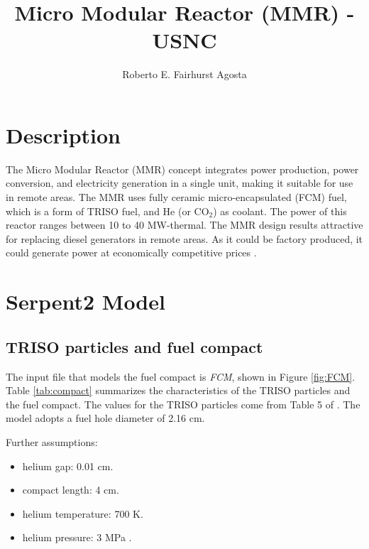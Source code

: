 \documentclass[11pt,letterpaper]{article}
\title{Micro Modular Reactor (MMR) - USNC}
\author{Roberto E. Fairhurst Agosta}
\begin{document}

\section{Description}

The Micro Modular Reactor (MMR) concept integrates power production, power conversion, and electricity generation in a single unit, making it suitable for use in remote areas. 
The MMR uses fully ceramic micro-encapsulated (FCM) fuel, which is a form of TRISO fuel, and He (or CO$_2$) as coolant.
The power of this reactor ranges between 10 to 40 MW-thermal.
The MMR design results attractive for replacing diesel generators in remote areas.
As it could be factory produced, it could generate power at economically competitive prices \cite{hawari_development_2018}.

\section{Serpent2 Model}

\subsection{TRISO particles and fuel compact}

The input file that models the fuel compact is \textit{FCM}, shown in Figure \ref{fig:FCM}.
Table \ref{tab:compact} summarizes the characteristics of the TRISO particles and the fuel compact.
The values for the TRISO particles come from Table 5 of \cite{hawari_development_2018}.
The model adopts a fuel hole diameter of 2.16 cm.

Further assumptions:
\begin{itemize}
	\item helium gap: 0.01 cm.
	\item compact length: 4 cm.
	\item helium temperature: 700 K.
	\item helium pressure: 3 MPa \cite{hawari_development_2018}.
\end{itemize}
\end{document}
